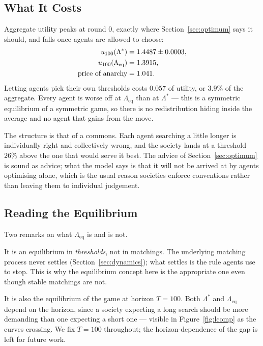 \documentclass[sigconf,anonymous]{aamas}
\newcommand{\Leq}{\Lambda_{\mathrm{eq}}}
\newcommand{\Lopt}{\Lambda^\ast}
\begin{document}
\subsection{What It Costs}

Aggregate utility peaks at round $0$, exactly where Section~\ref{sec:optimum}
says it should, and falls once agents are allowed to choose:
%
\begin{align}
  u_{100}(\Lopt) &= 1.4487 \pm 0.0003, \notag\\
  u_{100}(\Leq)  &= 1.3915, \label{eq:poa}\\
  \text{price of anarchy} &= 1.041 . \notag
\end{align}
%
Letting agents pick their own thresholds costs $0.057$ of utility, or $3.9\%$ of
the aggregate. Every agent is worse off at $\Leq$ than at $\Lopt$ --- this is a
symmetric equilibrium of a symmetric game, so there is no redistribution
hiding inside the average and no agent that gains from the move.

The structure is that of a commons. Each agent searching a little longer is
individually right and collectively wrong, and the society lands at a threshold
$26\%$ above the one that would serve it best. The advice of
Section~\ref{sec:optimum} is sound as advice; what the model says is that it
will not be arrived at by agents optimising alone, which is the usual reason
societies enforce conventions rather than leaving them to individual judgement.

\subsection{Reading the Equilibrium}

Two remarks on what $\Leq$ is and is not.

It is an equilibrium in \emph{thresholds}, not in matchings. The underlying
matching process never settles (Section~\ref{sec:dynamics}); what settles is the
rule agents use to stop. This is why the equilibrium concept here is the
appropriate one even though stable matchings are not.

It is also the equilibrium of the game at horizon $T = 100$. Both $\Lopt$ and
$\Leq$ depend on the horizon, since a society expecting a long search should be
more demanding than one expecting a short one --- visible in
Figure~\ref{fig:lcomp} as the curves crossing. We fix $T = 100$ throughout; the
horizon-dependence of the gap is left for future work.

\end{document}
